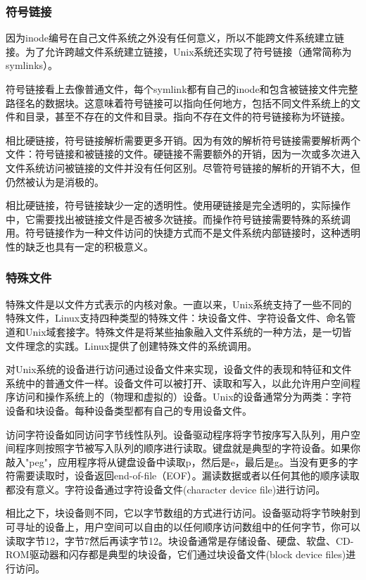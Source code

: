 \subsubsection{符号链接}

因为inode编号在自己文件系统之外没有任何意义，所以不能跨文件系统建立链接。为了允许跨越文件系统建立链接，Unix系统还实现了符号链接（通常简称为symlinks）。

符号链接看上去像普通文件，每个symlink都有自己的inode和包含被链接文件完整路径名的数据块。这意味着符号链接可以指向任何地方，包括不同文件系统上的文件和目录，甚至不存在的文件和目录。指向不存在文件的符号链接称为坏链接。

相比硬链接，符号链接解析需要更多开销。因为有效的解析符号链接需要解析两个文件：符号链接和被链接的文件。硬链接不需要额外的开销，因为一次或多次进入文件系统访问被链接的文件并没有任何区别。尽管符号链接的解析的开销不大，但仍然被认为是消极的。

相比硬链接，符号链接缺少一定的透明性。使用硬链接是完全透明的，实际操作中，它需要找出被链接文件是否被多次链接。而操作符号链接需要特殊的系统调用。符号链接作为一种文件访问的快捷方式而不是文件系统内部链接时，这种透明性的缺乏也具有一定的积极意义。

\subsubsection{特殊文件}

特殊文件是以文件方式表示的内核对象。一直以来，Unix系统支持了一些不同的特殊文件，Linux支持四种类型的特殊文件：块设备文件、字符设备文件、命名管道和Unix域套接字。特殊文件是将某些抽象融入文件系统的一种方法，是一切皆文件理念的实践。Linux提供了创建特殊文件的系统调用。

对Unix系统的设备进行访问通过设备文件来实现，设备文件的表现和特征和文件系统中的普通文件一样。设备文件可以被打开、读取和写入，以此允许用户空间程序访问和操作系统上的（物理和虚拟的）设备。Unix的设备通常分为两类：字符设备和块设备。每种设备类型都有自己的专用设备文件。

访问字符设备如同访问字节线性队列。设备驱动程序将字节按序写入队列，用户空间程序则按照字节被写入队列的顺序进行读取。键盘就是典型的字符设备。如果你敲入"peg"，应用程序将从键盘设备中读取p，然后是e，最后是g。当没有更多的字符需要读取时，设备返回end-of-file（EOF）。漏读数据或者以任何其他的顺序读取都没有意义。字符设备通过字符设备文件(character device file)进行访问。

相比之下，块设备则不同，它以字节数组的方式进行访问。设备驱动将字节映射到可寻址的设备上，用户空间可以自由的以任何顺序访问数组中的任何字节，你可以读取字节12，字节7然后再读字节12。块设备通常是存储设备、硬盘、软盘、CD-ROM驱动器和闪存都是典型的块设备，它们通过块设备文件(block device files)进行访问。

